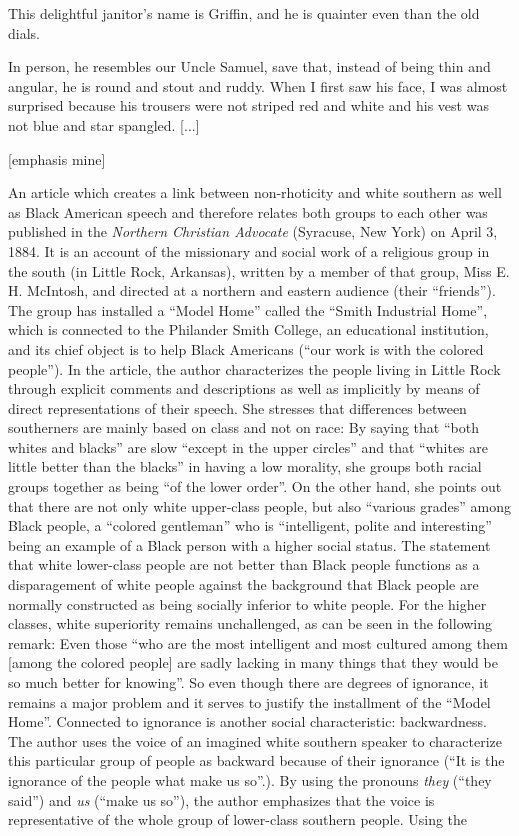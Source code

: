 \begin{ipquote}
{\centering {[...]}

This delightful janitor’s name is Griffin, and he is quainter even than the old dials.} {In person, he resembles our Uncle Samuel, save that, instead of being thin and angular, he is round and stout and ruddy. When I first saw his face, I was almost surprised because his trousers were not striped red and white and his vest was not blue and star spangled. {[...]}

\raggedleft
{[emphasis mine]}\\
}
\end{ipquote}

An article which creates a link between non-rhoticity and white southern as well as Black American speech and therefore relates both groups to each other was published in the \emph{Northern Christian Advocate} (Syracuse, New York) on April 3, 1884. It is an account of the missionary and social work of a religious group in the south (in Little Rock, Arkansas), written by a member of that group, Miss E. H. McIntosh, and directed at a northern and eastern audience (their “friends”). The group has installed a “Model Home” called the “Smith Industrial Home”, which is connected to the Philander Smith College, an educational institution, and its chief object is to help Black Americans (“our work is with the colored people”). In the article, the author characterizes the people living in Little Rock through explicit comments and descriptions as well as implicitly by means of direct representations of their speech. She stresses that differences between southerners are mainly based on class and not on race: By saying that “both whites and blacks” are slow “except in the upper circles” and that “whites are little better than the blacks” in having a low morality, she groups both racial groups together as being “of the lower order”. On the other hand, she points out that there are not only white upper-class people, but also “various grades” among Black people, a “colored gentleman” who is “intelligent, polite and interesting” being an example of a Black person with a higher social status. The statement that white lower-class people are not better than Black people functions as a disparagement of white people against the background that Black people are normally constructed as being socially inferior to white people. For the higher classes, white superiority remains unchallenged, as can be seen in the following remark: Even those “who are the most intelligent and most cultured among them [among the colored people] are sadly lacking in many things that they would be so much better for knowing”. So even though there are degrees of ignorance, it remains a major problem and it serves to justify the installment of the “Model Home”. Connected to ignorance is another social characteristic: backwardness. The author uses the voice of an imagined white southern speaker to characterize this particular group of people as backward because of their ignorance (“It is the ignorance of the people what make us so”.). By using the pronouns \emph{they} (“they said”) and \emph{us} (“make us so”), the author emphasizes that the voice is representative of the whole group of lower-class southern people. Using the 